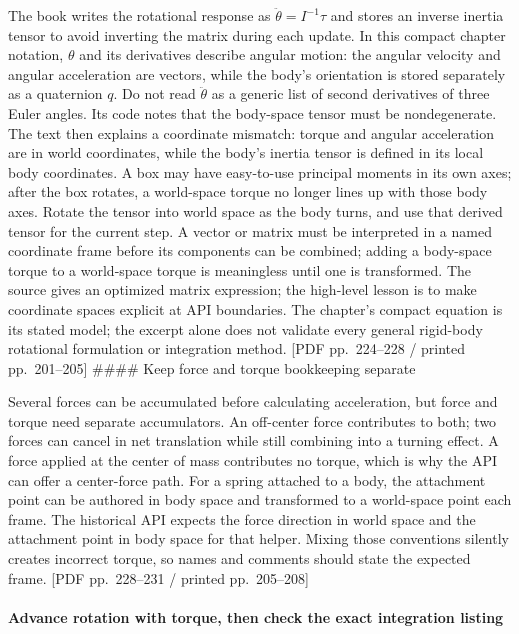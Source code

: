 The book writes the rotational response as \(\ddot{\theta}=I^{-1}\tau\) and stores an inverse inertia tensor to avoid inverting the matrix during each update. In this compact chapter notation, \(\theta\) and its derivatives describe angular motion: the angular velocity and angular acceleration are vectors, while the body's orientation is stored separately as a quaternion \(q\). Do not read \(\ddot{\theta}\) as a generic list of second derivatives of three Euler angles. Its code notes that the body-space tensor must be nondegenerate. The text then explains a coordinate mismatch: torque and angular acceleration are in world coordinates, while the body's inertia tensor is defined in its local body coordinates. A box may have easy-to-use principal moments in its own axes; after the box rotates, a world-space torque no longer lines up with those body axes. Rotate the tensor into world space as the body turns, and use that derived tensor for the current step. A vector or matrix must be interpreted in a named coordinate frame before its components can be combined; adding a body-space torque to a world-space torque is meaningless until one is transformed. The source gives an optimized matrix expression; the high-level lesson is to make coordinate spaces explicit at API boundaries. The chapter's compact equation is its stated model; the excerpt alone does not validate every general rigid-body rotational formulation or integration method. {[}PDF pp.~224--228 / printed pp.~201--205{]} \#\#\#\# Keep force and torque bookkeeping separate

Several forces can be accumulated before calculating acceleration, but force and torque need separate accumulators. An off-center force contributes to both; two forces can cancel in net translation while still combining into a turning effect. A force applied at the center of mass contributes no torque, which is why the API can offer a center-force path. For a spring attached to a body, the attachment point can be authored in body space and transformed to a world-space point each frame. The historical API expects the force direction in world space and the attachment point in body space for that helper. Mixing those conventions silently creates incorrect torque, so names and comments should state the expected frame. {[}PDF pp.~228--231 / printed pp.~205--208{]}

\paragraph{Advance rotation with torque, then check the exact integration listing}\label{advance-rotation-with-torque-then-check-the-exact-integration-listing}

